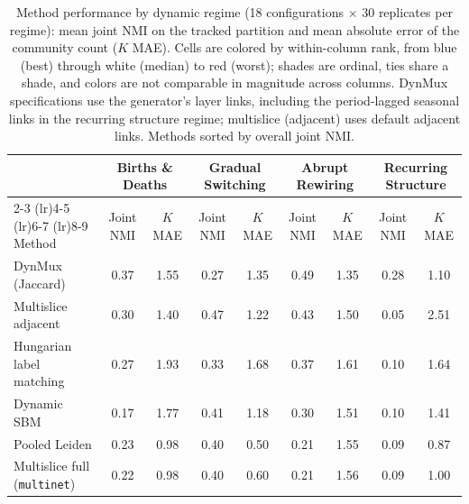 \documentclass[11pt, letterpaper]{article}
\begin{document}
\begin{table}[t]
\scriptsize
\centering
\caption{Method performance by dynamic regime (18 configurations $\times$ 30 replicates per regime): mean joint NMI on the tracked partition and mean absolute error of the community count ($K$ MAE). Cells are colored by within-column rank, from blue (best) through white (median) to red (worst); shades are ordinal, ties share a shade, and colors are not comparable in magnitude across columns. DynMux specifications use the generator's layer links, including the period-lagged seasonal links in the recurring structure regime; multislice (adjacent) uses default adjacent links. Methods sorted by overall joint NMI.}
\label{tab:metrics_wide}
\begin{tabular}{lcccccccc}
\toprule
& \multicolumn{2}{c}{Births \& Deaths} & \multicolumn{2}{c}{Gradual Switching} & \multicolumn{2}{c}{Abrupt Rewiring} & \multicolumn{2}{c}{Recurring Structure} \\
\cmidrule(lr){2-3} \cmidrule(lr){4-5} \cmidrule(lr){6-7} \cmidrule(lr){8-9}
Method & Joint NMI & $K$ MAE & Joint NMI & $K$ MAE & Joint NMI & $K$ MAE & Joint NMI & $K$ MAE \\
\midrule
DynMux (Jaccard) & 0.37 & 1.55 & 0.27 & 1.35 & 0.49 & 1.35 & 0.28 & 1.10 \\
Multislice adjacent & 0.30 & 1.40 & 0.47 & 1.22 & 0.43 & 1.50 & 0.05 & 2.51 \\
Hungarian label matching & 0.27 & 1.93 & 0.33 & 1.68 & 0.37 & 1.61 & 0.10 & 1.64 \\
Dynamic SBM & 0.17 & 1.77 & 0.41 & 1.18 & 0.30 & 1.51 & 0.10 & 1.41 \\
Pooled Leiden & 0.23 & 0.98 & 0.40 & 0.50 & 0.21 & 1.55 & 0.09 & 0.87 \\
Multislice full (\texttt{multinet}) & 0.22 & 0.98 & 0.40 & 0.60 & 0.21 & 1.56 & 0.09 & 1.00 \\
\bottomrule
\end{tabular}
\end{table}
\end{document}
